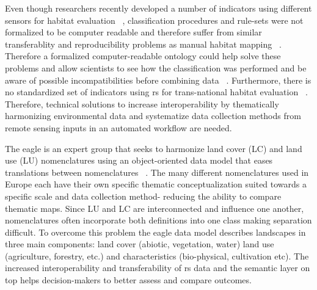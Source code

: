 \documentclass[authoryear,preprint,12pt,number]{elsarticle}
\begin{document}
Even though researchers recently developed a number of indicators using 
different sensors for habitat evaluation ~\citep{Nagendra2013}, classification 
procedures and rule-sets were not formalized to be computer readable and 
therefore suffer from similar transferablity and reproducibility problems as 
manual habitat mapping ~\citep{Arvor2013, Nieland2015a, Nieland2015b}. 
Therefore a formalized computer-readable ontology could help solve these 
problems and allow scientists to see how the classification was performed and 
be aware of possible incompatibilities before combining data 
~\citep{Janowicz2012}.  Furthermore, there is no standardized set of indicators 
using \gls{rs} for trans-national habitat evaluation ~\citep{Lucas2015, 
VandenBorre2011}. Therefore, technical solutions to increase interoperability 
by thematically harmonizing environmental data and systematize data collection 
methods from remote sensing inputs in an automated workflow are needed. 

The \gls{eagle} is an expert 
group that seeks to harmonize land cover (LC) and land use (LU) nomenclatures 
using an object-oriented data model that eases translations between 
nomenclatures ~\citep{arnold2013eagle}. The many different nomenclatures used 
in 
Europe each have their own specific thematic conceptualization suited towards a 
specific scale and data collection method- reducing the ability to compare 
thematic maps. Since LU and LC are interconnected and influence one another, 
nomenclatures often incorporate both definitions into one class making 
separation difficult. To overcome this problem the \gls{eagle} data model 
describes landscapes in three main components: land cover (abiotic, vegetation, 
water) land use (agriculture, forestry, etc.) and characteristics 
(bio-physical, cultivation etc). The increased interoperability and 
transferability of \gls{rs} data and the semantic layer on top helps 
decision-makers to better assess and compare outcomes. 
\end{document}
